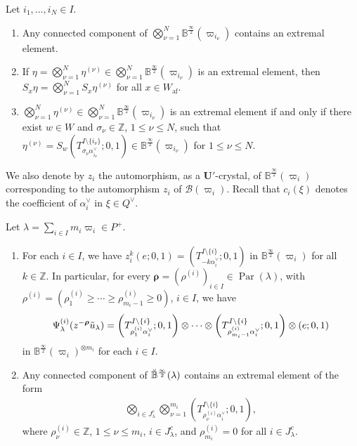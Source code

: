 \documentclass[ALCO,ThmDefs,Unicode,epreuves]{cedram}
\newcommand{\BZ}{\mathbb{Z}}
\newcommand\bmrho[1]{\boldsymbol{#1}}
\renewcommand{\U}{\mathbf{U}}
\newcommand{\si}{\frac{\infty}{2}}
\DeclareMathOperator{\af}{af}
\DeclareMathOperator{\Par}{Par}
\begin{document}
\begin{lemm} \label{lem:extremal-paths}
Let 
$i_1 , \ldots , i_N \in I$. 
\begin{enumerate}[label=(\arabic*)]
\item\label{Lemm3.7_1}
Any connected component of 
$\bigotimes_{\nu = 1}^N \mathbb{B}^{\si}(\varpi_{i_{\nu}})$ 
contains an extremal element.
\item\label{Lemm3.7_2}
If 
$\eta = \bigotimes_{\nu = 1}^N \eta^{(\nu)} \in \bigotimes_{\nu = 1}^N \mathbb{B}^{\si}(\varpi_{i_{\nu}})$
is an extremal element, then 
$S_x \eta = \bigotimes_{\nu = 1}^N S_x \eta^{(\nu)}$
for all 
$x \in W_{\af}$. 
\item\label{Lemm3.7_3}
$\bigotimes_{\nu = 1}^N \eta^{(\nu)} \in \bigotimes_{\nu = 1}^N \mathbb{B}^{\si}(\varpi_{i_{\nu}})$
is an extremal element if and only if there exist
$w \in W$ 
and 
$\sigma_{\nu} \in \BZ$, $1 \leq \nu \leq N$, 
such that 
$\eta^{(\nu)} 
= 
S_w \left( T^{I \setminus \{ i_{\nu} \}}_{\sigma_{\nu} \alpha_{i_{\nu}}^{\vee}} ; 0,1 \right) \in \mathbb{B}^{\si}(\varpi_{i_{\nu}})$
for 
$1 \leq \nu \leq N$. 
\end{enumerate}
\end{lemm}

We also denote by
$z_i$ 
the automorphism, as a $\U'$-crystal, of 
$\mathbb{B}^{\si}(\varpi_i)$ 
corresponding to the automorphism 
$z_i$ 
of 
$\mathcal{B}(\varpi_i)$.
Recall that 
$c_i(\xi)$ 
denotes the coefficient of 
$\alpha_i^{\vee}$ 
in 
$\xi \in Q^{\vee}$.

\begin{lemm} \label{lem:SiLS_W-action}
Let 
$\lambda = \sum_{i \in I} m_i \varpi_i \in P^+$. 
\begin{enumerate}[label=(\arabic*)]
\item\label{Lemm3.8_1}
For each $i \in I$, 
we have
$z_i^k(e;0,1) = \left( T^{I \setminus \{ i \}}_{-k \alpha_i^{\vee}} ; 0,1 \right)$
in 
$\mathbb{B}^{\si}(\varpi_i)$
for all 
$k \in \BZ$. 
In particular, 
for every 
$\bmrho{\rho} = (\rho^{(i)})_{i \in I} \in \Par (\lambda)$, 
with 
$\rho^{(i)} = (\rho^{(i)}_1 \geq \cdots \geq \rho^{(i)}_{m_i-1} \geq 0)$, 
$i \in I$, 
we have
\begin{align}
\Psi_{\lambda}^{(i)}(z^{-\bmrho{\rho}} \Tilde{u}_{\lambda}) 
=
\left( T_{\rho^{(i)}_1 \alpha_i^{\vee}}^{I \setminus \{ i \}} ; 0,1\right)
\otimes \cdots \otimes
\left( T_{\rho^{(i)}_{m_i-1} \alpha_i^{\vee}}^{I \setminus \{ i \}} ; 0,1\right)
\otimes
(e;0,1)
\end{align}
in 
$\mathbb{B}^{\si}(\varpi_i)^{\otimes m_i}$
for each 
$i \in I$. 
\item\label{Lemm3.8_2}
Any connected component of 
$\Breve{\mathbb{B}}^{\si}(\lambda)$
contains an extremal element of the form 
\begin{align}
\bigotimes_{i \in J_{\lambda}^c} \bigotimes_{\nu = 1}^{m_i} \left(T^{I \setminus \{ i \}}_{\rho^{(i)}_{\nu} \alpha_i^{\vee}};0,1 \right),
\end{align}
where 
$\rho^{(i)}_{\nu} \in \BZ$, 
$1 \leq \nu \leq m_i$, 
$i \in J_{\lambda}^c$, 
and 
$\rho^{(i)}_{m_i} = 0$
for all 
$i \in J_{\lambda}^c$.
\end{enumerate}
\end{lemm}
\end{document}

